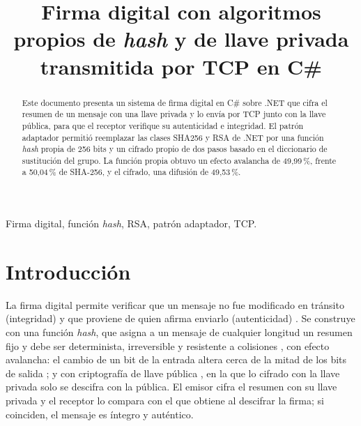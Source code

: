 \documentclass[conference]{IEEEtran}
\begin{document}
\title{Firma digital con algoritmos propios de \textit{hash} y de llave privada transmitida por TCP en C\#}

\author{
\and
{}
\and
{}
}

\maketitle

\begin{abstract}
Este documento presenta un sistema de firma digital en C\# sobre .NET que cifra el resumen de un mensaje con una llave privada y lo envía por TCP junto con la llave pública, para que el receptor verifique su autenticidad e integridad. El patrón adaptador permitió reemplazar las clases SHA256 y RSA de .NET por una función \textit{hash} propia de 256 bits y un cifrado propio de dos pasos basado en el diccionario de sustitución del grupo. La función propia obtuvo un efecto avalancha de 49,99\,\%, frente a 50,04\,\% de SHA-256, y el cifrado, una difusión de 49,53\,\%.
\end{abstract}

\begin{IEEEkeywords}
Firma digital, función \textit{hash}, RSA, patrón adaptador, TCP.
\end{IEEEkeywords}

\section{Introducción}

La firma digital permite verificar que un mensaje no fue modificado en tránsito (integridad) y que proviene de quien afirma enviarlo (autenticidad) \cite{menezes}. Se construye con una función \textit{hash}, que asigna a un mensaje de cualquier longitud un resumen fijo y debe ser determinista, irreversible y resistente a colisiones \cite{menezes,fips180}, con efecto avalancha: el cambio de un bit de la entrada altera cerca de la mitad de los bits de salida \cite{feistel}; y con criptografía de llave pública \cite{rsa}, en la que lo cifrado con la llave privada solo se descifra con la pública. El emisor cifra el resumen con su llave privada y el receptor lo compara con el que obtiene al descifrar la firma; si coinciden, el mensaje es íntegro y auténtico.
\end{document}
